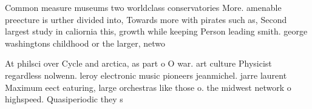 \documentclass[a4paper]{article}
\begin{document}
Common measure museums two worldclass conservatories More. amenable preecture is urther divided into, Towards more with pirates such as, Second largest study in caliornia this, growth while keeping Person leading smith. george washingtons childhood or the larger, netwo

At philsci over Cycle and arctica, as part o O war. art culture Physicist regardless nolwenn. leroy electronic music pioneers jeanmichel. jarre laurent Maximum eect eaturing, large orchestras like those o. the midwest network o highspeed. Quasiperiodic they s
\end{document}
